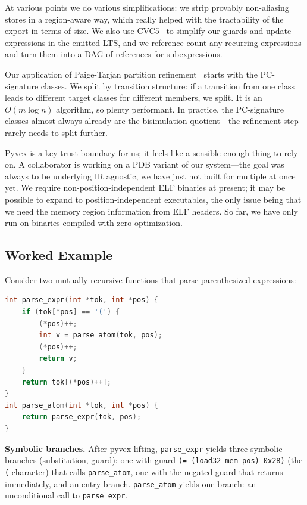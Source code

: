 \documentclass[conference]{./template/IEEEtran}
\begin{document}
At various points we do various simplifications: we strip provably non-aliasing stores in a region-aware way, which really helped with the tractability of the export in terms of size. We also use CVC5~\cite{barbosa2022cvc5} to simplify our guards and update expressions in the emitted LTS, and we reference-count any recurring expressions and turn them into a DAG of references for subexpressions.

Our application of Paige-Tarjan partition refinement~\cite{paige1987three} starts with the PC-signature classes. We split by transition structure: if a transition from one class leads to different target classes for different members, we split. It is an $O(m \log n)$ algorithm, so plenty performant. In practice, the PC-signature classes almost always already are the bisimulation quotient---the refinement step rarely needs to split further.

Pyvex is a key trust boundary for us; it feels like a sensible enough thing to rely on. A collaborator is working on a PDB variant of our system---the goal was always to be underlying IR agnostic, we have just not built for multiple at once yet. We require non-position-independent ELF binaries at present; it may be possible to expand to position-independent executables, the only issue being that we need the memory region information from ELF headers. So far, we have only run on binaries compiled with zero optimization.

\subsection{Worked Example}

Consider two mutually recursive functions that parse parenthesized expressions:

\begin{lstlisting}[language=C,basicstyle=\ttfamily\scriptsize,frame=single]
int parse_expr(int *tok, int *pos) {
    if (tok[*pos] == '(') {
        (*pos)++;
        int v = parse_atom(tok, pos);
        (*pos)++;
        return v;
    }
    return tok[(*pos)++];
}
int parse_atom(int *tok, int *pos) {
    return parse_expr(tok, pos);
}
\end{lstlisting}

\noindent\textbf{Symbolic branches.} After pyvex lifting, \texttt{parse\_expr} yields three symbolic branches (substitution, guard): one with guard \texttt{(= (load32 mem pos) 0x28)} (the \texttt{(} character) that calls \texttt{parse\_atom}, one with the negated guard that returns immediately, and an entry branch. \texttt{parse\_atom} yields one branch: an unconditional call to \texttt{parse\_expr}.
\end{document}
